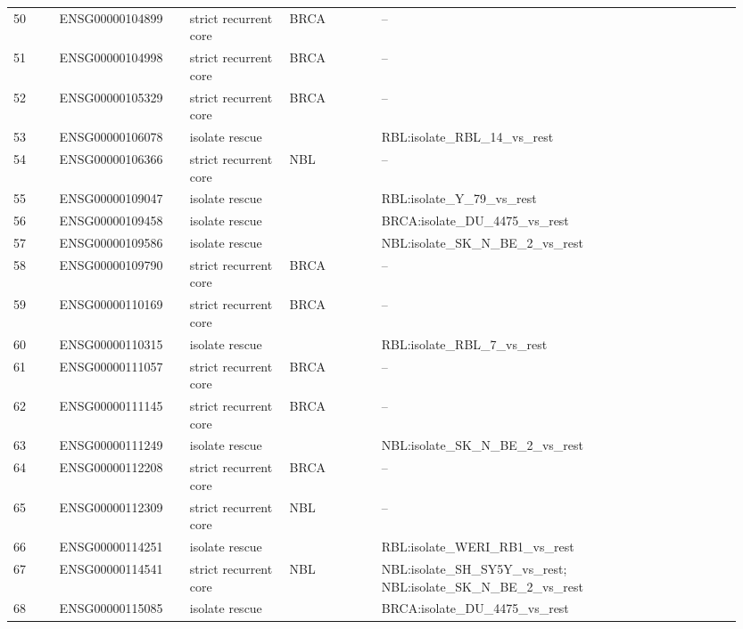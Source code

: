 \begin{landscape}
{\begin{longtable}{p{0.06\linewidth}p{0.17\linewidth}p{0.13\linewidth}p{0.12\linewidth}p{0.47\linewidth}}
50 & ENSG00000104899 & strict recurrent core & BRCA & -- \\
51 & ENSG00000104998 & strict recurrent core & BRCA & -- \\
52 & ENSG00000105329 & strict recurrent core & BRCA & -- \\
53 & ENSG00000106078 & isolate rescue &  & RBL:isolate\_\allowbreak{}RBL\_\allowbreak{}14\_\allowbreak{}vs\_\allowbreak{}rest \\
54 & ENSG00000106366 & strict recurrent core & NBL & -- \\
55 & ENSG00000109047 & isolate rescue &  & RBL:isolate\_\allowbreak{}Y\_\allowbreak{}79\_\allowbreak{}vs\_\allowbreak{}rest \\
56 & ENSG00000109458 & isolate rescue &  & BRCA:isolate\_\allowbreak{}DU\_\allowbreak{}4475\_\allowbreak{}vs\_\allowbreak{}rest \\
57 & ENSG00000109586 & isolate rescue &  & NBL:isolate\_\allowbreak{}SK\_\allowbreak{}N\_\allowbreak{}BE\_\allowbreak{}2\_\allowbreak{}vs\_\allowbreak{}rest \\
58 & ENSG00000109790 & strict recurrent core & BRCA & -- \\
59 & ENSG00000110169 & strict recurrent core & BRCA & -- \\
60 & ENSG00000110315 & isolate rescue &  & RBL:isolate\_\allowbreak{}RBL\_\allowbreak{}7\_\allowbreak{}vs\_\allowbreak{}rest \\
61 & ENSG00000111057 & strict recurrent core & BRCA & -- \\
62 & ENSG00000111145 & strict recurrent core & BRCA & -- \\
63 & ENSG00000111249 & isolate rescue &  & NBL:isolate\_\allowbreak{}SK\_\allowbreak{}N\_\allowbreak{}BE\_\allowbreak{}2\_\allowbreak{}vs\_\allowbreak{}rest \\
64 & ENSG00000112208 & strict recurrent core & BRCA & -- \\
65 & ENSG00000112309 & strict recurrent core & NBL & -- \\
66 & ENSG00000114251 & isolate rescue &  & RBL:isolate\_\allowbreak{}WERI\_\allowbreak{}RB1\_\allowbreak{}vs\_\allowbreak{}rest \\
67 & ENSG00000114541 & strict recurrent core & NBL & NBL:isolate\_\allowbreak{}SH\_\allowbreak{}SY5Y\_\allowbreak{}vs\_\allowbreak{}rest; NBL:isolate\_\allowbreak{}SK\_\allowbreak{}N\_\allowbreak{}BE\_\allowbreak{}2\_\allowbreak{}vs\_\allowbreak{}rest \\
68 & ENSG00000115085 & isolate rescue &  & BRCA:isolate\_\allowbreak{}DU\_\allowbreak{}4475\_\allowbreak{}vs\_\allowbreak{}rest \\

\end{longtable}}
\end{landscape}
